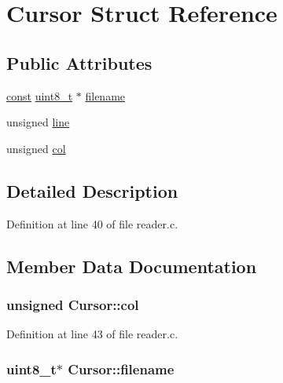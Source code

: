 \hypertarget{struct_cursor}{}\section{Cursor Struct Reference}
\label{struct_cursor}
\subsection*{Public Attributes}
\begin{DoxyCompactItemize}
\item 
\hyperlink{getopt1_8c_a2c212835823e3c54a8ab6d95c652660e}{const} \hyperlink{lib-src_2ffmpeg_2win32_2stdint_8h_a9a941819355e6f658991890ff66b4b0e}{uint8\+\_\+t} $\ast$ \hyperlink{struct_cursor_a61ce50a14bcc2cf08334e4c53d37801a}{filename}
\item 
unsigned \hyperlink{struct_cursor_a5a8e665bc240497b8493cd37ca2bb797}{line}
\item 
unsigned \hyperlink{struct_cursor_a093085ae2880b51e3dcf36e9e8c98227}{col}
\end{DoxyCompactItemize}


\subsection{Detailed Description}


Definition at line 40 of file reader.\+c.



\subsection{Member Data Documentation}
\subsubsection[{\texorpdfstring{col}{col}}]{\setlength{\rightskip}{0pt plus 5cm}unsigned Cursor\+::col}\hypertarget{struct_cursor_a093085ae2880b51e3dcf36e9e8c98227}{}\label{struct_cursor_a093085ae2880b51e3dcf36e9e8c98227}


Definition at line 43 of file reader.\+c.

\subsubsection[{\texorpdfstring{filename}{filename}}]{ {\bf uint8\+\_\+t}$\ast$ Cursor\+::filename}\hypertarget{struct_cursor_a61ce50a14bcc2cf08334e4c53d37801a}{}\label{struct_cursor_a61ce50a14bcc2cf08334e4c53d37801a}



